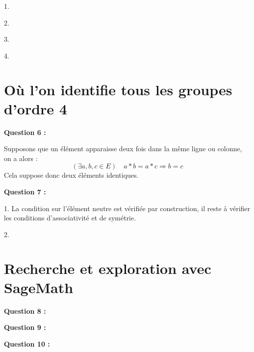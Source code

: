 \documentclass[titlepage]{article}
\begin{document}
    1.

    2.

    3.

    4.
    \section{Où l’on identifie tous les groupes d’ordre 4}
    \textbf{Question 6 :}

    Supposons que un élément apparaisse deux fois dans la même ligne ou colonne, on a alors :
    \[(\exists a, b, c \in E) \quad a*b=a*c \Longrightarrow b = c\]
    Cela suppose donc deux éléments identiques.

    \textbf{Question 7 :}

    1. La condition sur l'élément neutre est vérifiée par construction, il reste à vérifier les conditions d'associativité et de symétrie.

    2.
    \section{Recherche et exploration avec SageMath}
    \textbf{Question 8 :}

    \textbf{Question 9 :}

    \textbf{Question 10 :}
\end{document}
